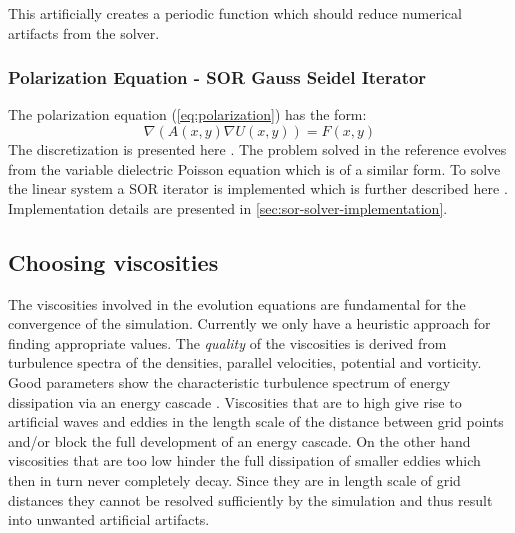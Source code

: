 \documentclass[master.tex]{subfiles}
\begin{document}
This artificially creates a periodic function which should reduce numerical artifacts from the solver.

\subsubsection{Polarization Equation - \ac{SOR} Gauss Seidel Iterator} \label{sec:polarization-equation}
The polarization equation (\autoref{eq:polarization}) has the form:
\begin{equation}
    \nabla\left( A(x, y) \nabla U(x, y)\right) = F(x, y)
\end{equation}
The discretization is presented here \cite{DielectricPoisson}. The problem solved in the reference evolves from the variable dielectric Poisson equation which is of a similar form. To solve the linear system a \ac{SOR} iterator is implemented which is further described here \cite{SORPaper}. Implementation details are presented in \autoref{sec:sor-solver-implementation}.

\subsection{Choosing viscosities}
The viscosities involved in the evolution equations are fundamental for the convergence of the simulation. Currently we only have a heuristic approach for finding appropriate values.\newline
The \textit{quality} of the viscosities is derived from turbulence spectra of the densities, parallel velocities, potential and vorticity. Good parameters show the characteristic turbulence spectrum of energy dissipation via an energy cascade \cite{TurbulentSpectra}.\newline
Viscosities that are to high give rise to artificial waves and eddies in the length scale of the distance between grid points and/or block the full development of an energy cascade. On the other hand viscosities that are too low hinder the full dissipation of smaller eddies which then in turn never completely decay. Since they are in length scale of grid distances they cannot be resolved sufficiently by the simulation and thus result into unwanted artificial artifacts.
\end{document}
